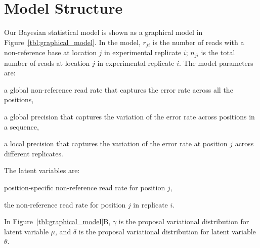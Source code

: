 \documentclass[11pt,reqno]{amsart}
\begin{document}
\section{Model Structure}
Our Bayesian statistical model is shown as a graphical model in Figure~\ref{tbl:graphical_model}.
In the model, $r_{ji}$ is the number of reads with a non-reference base at location $j$ in experimental replicate $i$; $n_{ji}$ is the total number of reads at location $j$ in experimental replicate $i$.
The model parameters are:
\begin{description}[noitemsep]
  \item[$\mu_0$] a global non-reference read rate that captures the error rate across all the positions,
  \item[$M_0$] a global precision that captures the variation of the error rate across positions in a sequence,
  \item[$M_j$] a local precision that captures the variation of the error rate at position $j$ across different replicates.
\end{description}
The latent variables are:
\begin{description}[noitemsep]
  \item[$\mu_j \sim \text{Beta}(\mu_0, M_0)$] position-specific non-reference read rate for position $j$,
  \item[$\theta_{ji} \sim \text{Beta}(\mu_j, M_j)$] the non-reference read rate for position $j$ in replicate $i$.
\end{description}

In Figure~\ref{tbl:graphical_model}B, $\gamma$ is the proposal variational distribution for latent variable $\mu$, 
and $\delta$ is the proposal variational distribution for latent variable $\theta$.
\end{document}
